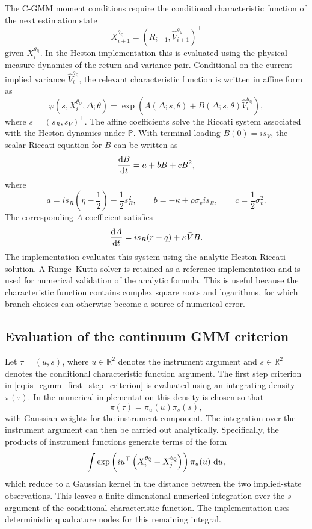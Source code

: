 \documentclass[11pt,a4paper,notitlepage]{article}
\numberwithin{equation}{section}
\begin{document}
The C-GMM moment conditions require the conditional characteristic function of the next estimation state
\[
X_{i+1}^{\theta_{\mathbb Q}}
=
\left(
R_{i+1},
\widehat V_{i+1}^{\theta_{\mathbb Q}}
\right)^\top
\]
given \(X_i^{\theta_{\mathbb Q}}\). In the Heston implementation this is evaluated using the physical-measure dynamics of the return and variance pair. Conditional on the current implied variance \(\widehat V_i^{\theta_{\mathbb Q}}\), the relevant characteristic function is written in affine form as
\[
\varphi\left(s,X_i^{\theta_{\mathbb Q}},\Delta;\theta\right)
=
\exp\left(
A(\Delta;s,\theta)
+
B(\Delta;s,\theta)
\widehat V_i^{\theta_{\mathbb Q}}
\right),
\label{eq:app_heston_transition_ccf}
\]
where \(s=(s_R,s_V)^\top\). The affine coefficients solve the Riccati system associated with the Heston dynamics under \(\mathbb P\). With terminal loading \(B(0)=is_V\), the scalar Riccati equation for \(B\) can be written as
\[
\frac{\dif B}{\dif t}
=
a+bB+cB^2,
\]
where
\[
a
=
is_R\left(\eta-\frac{1}{2}\right)
-\frac{1}{2}s_R^2,
\qquad
b
=
-\kappa+\rho\sigma_v is_R,
\qquad
c
=
\frac{1}{2}\sigma_v^2 .
\]
The corresponding \(A\) coefficient satisfies
\[
\frac{\dif A}{\dif t}
=
is_R(r-q)+\kappa\bar V B .
\]
The implementation evaluates this system using the analytic Heston Riccati solution. A Runge--Kutta solver is retained as a reference implementation and is used for numerical validation of the analytic formula. This is useful because the characteristic function contains complex square roots and logarithms, for which branch choices can otherwise become a source of numerical error.

\subsection{Evaluation of the continuum GMM criterion}

Let \(\tau=(u,s)\), where \(u\in\mathbb R^2\) denotes the instrument argument and \(s\in\mathbb R^2\) denotes the conditional characteristic function argument. The first step criterion in \eqref{eq:is_cgmm_first_step_criterion} is evaluated using an integrating density \(\pi(\tau)\). In the numerical implementation this density is chosen so that
\[
\pi(\tau)=\pi_u(u)\pi_s(s),
\]
with Gaussian weights for the instrument component. The integration over the instrument argument can then be carried out analytically. Specifically, the products of instrument functions generate terms of the form
\[
\int
\exp\left(
iu^\top
\left(
X_i^{\theta_{\mathbb Q}}
-
X_j^{\theta_{\mathbb Q}}
\right)
\right)
\pi_u(u)\,\dif u ,
\]
which reduce to a Gaussian kernel in the distance between the two implied-state observations. This leaves a finite dimensional numerical integration over the \(s\)-argument of the conditional characteristic function. The implementation uses deterministic quadrature nodes for this remaining integral.
\end{document}
